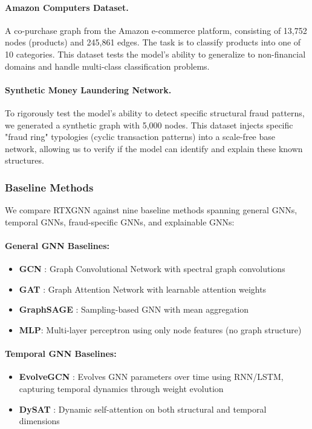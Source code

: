 \paragraph{Amazon Computers Dataset.} A co-purchase graph from the Amazon e-commerce platform, consisting of 13,752 nodes (products) and 245,861 edges. The task is to classify products into one of 10 categories. This dataset tests the model's ability to generalize to non-financial domains and handle multi-class classification problems.

\paragraph{Synthetic Money Laundering Network.} To rigorously test the model's ability to detect specific structural fraud patterns, we generated a synthetic graph with 5,000 nodes. This dataset injects specific "fraud ring" typologies (cyclic transaction patterns) into a scale-free base network, allowing us to verify if the model can identify and explain these known structures.

\subsubsection{Baseline Methods}

We compare RTXGNN against nine baseline methods spanning general GNNs, temporal GNNs, fraud-specific GNNs, and explainable GNNs:

\paragraph{General GNN Baselines:}
\begin{itemize}
    \item \textbf{GCN} \citep{kipf2017gcn}: Graph Convolutional Network with spectral graph convolutions
    \item \textbf{GAT} \citep{velickovic2018gat}: Graph Attention Network with learnable attention weights
    \item \textbf{GraphSAGE} \citep{hamilton2017graphsage}: Sampling-based GNN with mean aggregation
    \item \textbf{MLP}: Multi-layer perceptron using only node features (no graph structure)
\end{itemize}

\paragraph{Temporal GNN Baselines:}
\begin{itemize}
    \item \textbf{EvolveGCN} \citep{pareja2020evolvegcn}: Evolves GNN parameters over time using RNN/LSTM, capturing temporal dynamics through weight evolution
    \item \textbf{DySAT} \citep{sankar2020dysat}: Dynamic self-attention on both structural and temporal dimensions
\end{itemize}


